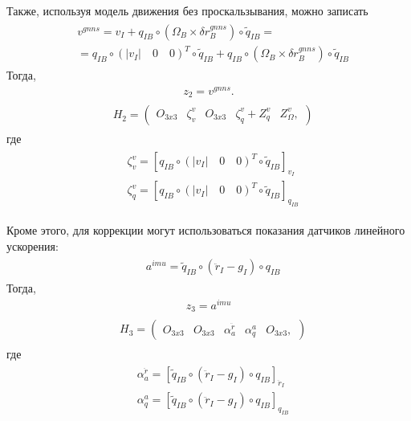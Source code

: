 \documentclass[a4paper,12pt]{article}
\begin{document}
Также, используя модель движения без проскальзывания, можно записать
\begin{align}
\begin{split}
&v^{gnns} = v_I + q_{IB} \circ  (\Omega_B \times \delta r^{gnns}_B) \circ \tilde{q}_{IB} = \\
& = q_{IB} \circ (|v_I| \quad 0 \quad 0)^T \circ \tilde{q}_{IB} + q_{IB} \circ  (\Omega_B \times \delta r^{gnns}_B) \circ \tilde{q}_{IB}
\end{split}
\end{align}
Тогда, 
\begin{align}
z_2 = v^{gnns}.
\end{align}
\begin{align}
\begin{split}
&H_2 =
\begin{pmatrix}
O_{3x3} & \zeta^v_v & O_{3x3} & \zeta^v_q + Z^v_q & Z^v_{\Omega},
\end{pmatrix}
\end{split}
\end{align}
где
\begin{align}
\begin{split}
&\zeta^v_v = [q_{IB} \circ (|v_I| \quad 0 \quad 0)^T \circ \tilde{q}_{IB}]_{ v_I} \\
&\zeta^v_q = [q_{IB} \circ (|v_I| \quad 0 \quad 0)^T \circ \tilde{q}_{IB}]_{ q_{IB}}
\end{split}
\end{align}

Кроме этого, для коррекции могут использоваться показания датчиков линейного ускорения:
\begin{align} 
\begin{split}
&a^{imu}  = \tilde{q}_{IB} \circ (\ddot{r}_{I} - g_I) \circ q_{IB}
\end{split}
\end{align}
Тогда, 
\begin{align}
z_3 = a^{imu}
\end{align}
\begin{align}
\begin{split}
&H_3 =
\begin{pmatrix}
O_{3x3} & O_{3x3} & \alpha^{\ddot{r}}_a & \alpha^a_q & O_{3x3},
\end{pmatrix}
\end{split}
\end{align}
где
\begin{align}
\begin{split}
&\alpha^{\ddot{r}}_a = [\tilde{q}_{IB} \circ (\ddot{r}_{I} - g_I) \circ q_{IB}]_{ \ddot{r}_I} \\
&\alpha^a_q = [\tilde{q}_{IB} \circ (\ddot{r}_{I} - g_I) \circ q_{IB}]_{ {q}_{IB}}
\end{split}
\end{align}
\end{document}
